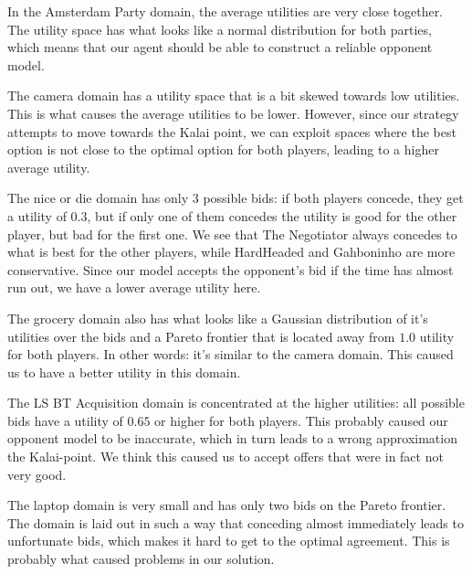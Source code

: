 In the Amsterdam Party domain, the average utilities are very close together. The utility space has what looks like a normal distribution for both parties, which means that our agent should be able to construct a reliable opponent model. 

The camera domain has a utility space that is a bit skewed towards low utilities. This is what causes the average utilities to be lower. However, since our strategy attempts to move towards the Kalai point, we can exploit spaces where the best option is not close to the optimal option for both players, leading to a higher average utility.

The nice or die domain has only 3 possible bids: if both players concede, they get a utility of 0.3, but if only one of them concedes the utility is good for the other player, but bad for the first one. We see that The Negotiator always concedes to what is best for the other players, while HardHeaded and Gahboninho are more conservative. Since our model accepts the opponent's bid if the time has almost run out, we have a lower average utility here.

The grocery domain also has what looks like a Gaussian distribution of it's utilities over the bids and a Pareto frontier that is located away from $1.0$ utility for both players. In other words: it's similar to the camera domain. This caused us to have a better utility in this domain.

The LS BT Acquisition domain is concentrated at the higher utilities: all possible bids have a utility of $0.65$ or higher for both players. This probably caused our opponent model to be inaccurate, which in turn leads to a wrong approximation the Kalai-point. We think this caused us to accept offers that were in fact not very good.

The laptop domain is very small and has only two bids on the Pareto frontier. The domain is laid out in such a way that conceding almost immediately leads to unfortunate bids, which makes it hard to get to the optimal agreement. This is probably what caused problems in our solution.

